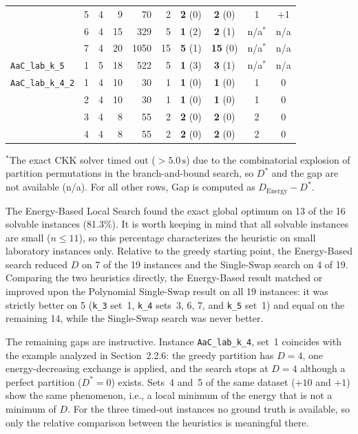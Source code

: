 \documentclass[11pt,a4paper]{article}
\begin{document}
\begin{table}[H]
\begin{tabular}{llrrrrcccc}
                        & 5 & 4 & 9 & 70 & 2 & \textbf{2} (0) & \textbf{2} (0) & 1 & +1 \\
                        & 6 & 4 & 15 & 329 & 5 & \textbf{1} (2) & \textbf{2} (1) & n/a$^*$ & n/a \\
                        & 7 & 4 & 20 & 1050 & 15 & \textbf{5} (1) & \textbf{15} (0) & n/a$^*$ & n/a \\
\midrule
\texttt{AaC\_lab\_k\_5} & 1 & 5 & 18 & 522 & 5 & \textbf{1} (3) & \textbf{3} (1) & n/a$^*$ & n/a \\
\midrule
\texttt{AaC\_lab\_k\_4\_2} & 1 & 4 & 10 & 30 & 1 & \textbf{1} (0) & \textbf{1} (0) & 1 & 0 \\
                        & 2 & 4 & 10 & 30 & 1 & \textbf{1} (0) & \textbf{1} (0) & 1 & 0 \\
                        & 3 & 4 & 8 & 55 & 2 & \textbf{2} (0) & \textbf{2} (0) & 2 & 0 \\
                        & 4 & 4 & 8 & 55 & 2 & \textbf{2} (0) & \textbf{2} (0) & 2 & 0 \\
\bottomrule
\end{tabular}

\vspace{4pt}

\parbox{0.95\linewidth}{\footnotesize $^*$The exact CKK solver timed out ($>5.0\,\text{s}$) due to the combinatorial explosion of partition permutations in the branch-and-bound search, so $D^*$ and the gap are not available (n/a). For all other rows, Gap is computed as $D_{\mathrm{Energy}} - D^*$.}
\end{table}

The Energy-Based Local Search found the exact global optimum on 13 of the 16 solvable instances (81.3\%). It is worth keeping in mind that all solvable instances are small ($n\le 11$), so this percentage characterizes the heuristic on small laboratory instances only. Relative to the greedy starting point, the Energy-Based search reduced $D$ on 7 of the 19 instances and the Single-Swap search on 4 of 19. Comparing the two heuristics directly, the Energy-Based result matched or improved upon the Polynomial Single-Swap result on all 19 instances: it was strictly better on 5 (\texttt{k\_3} set~1, \texttt{k\_4} sets~3, 6, 7, and \texttt{k\_5} set~1) and equal on the remaining 14, while the Single-Swap search was never better.

The remaining gaps are instructive. Instance \texttt{AaC\_lab\_k\_4}, set~1 coincides with the example analyzed in Section~2.2.6: the greedy partition has $D=4$, one energy-decreasing exchange is applied, and the search stops at $D=4$ although a perfect partition ($D^*=0$) exists. Sets~4 and~5 of the same dataset ($+10$ and $+1$) show the same phenomenon, i.e., a local minimum of the energy that is not a minimum of $D$. For the three timed-out instances no ground truth is available, so only the relative comparison between the heuristics is meaningful there.
\end{document}
